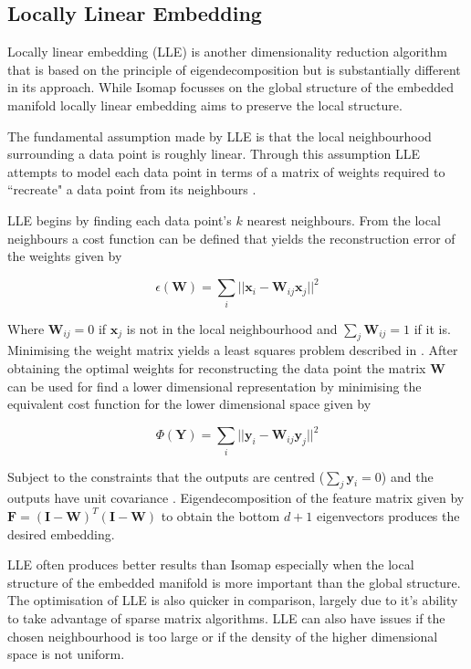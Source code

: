 \subsection{Locally Linear Embedding}
Locally linear embedding (LLE) \cite{roweis2000nonlinear} is another dimensionality reduction algorithm that is based on the principle of eigendecomposition but is substantially different in its approach. While Isomap focusses on the global structure of the embedded manifold locally linear embedding aims to preserve the local structure.

The fundamental assumption made by LLE is that the local neighbourhood surrounding a data point is roughly linear. Through this assumption LLE attempts to model each data point in terms of a matrix of weights required to ``recreate" a data point from its neighbours \cite{strange2014open}. 

LLE begins by finding each data point's $k$ nearest neighbours. From the local neighbours a cost function can be defined that yields the reconstruction error of the weights given by

\begin{equation}
	\epsilon(\bm{W}) = \sum\limits_i || \bm{x}_i - \bm{W}_{ij}\bm{x}_j ||^2 
\end{equation}

Where $\bm{W}_{ij} = 0$ if $\bm{x}_j$ is not in the local neighbourhood and $\sum\limits_j \bm{W}_{ij} = 1$ if it is. Minimising the weight matrix yields a least squares problem described in \cite{roweis2000nonlinear}. After obtaining the optimal weights for reconstructing the data point the matrix $\bm{W}$ can be used for find a lower dimensional representation by minimising the equivalent cost function for the lower dimensional space given by

 \begin{equation}
 	\Phi(\bm{Y}) = \sum\limits_i || \bm{y}_i - \bm{W}_{ij}\bm{y}_j ||^2 
 \end{equation}
 
 Subject to the constraints that the outputs are centred ($\sum\limits_j \bm{y}_i = 0$) and the outputs have unit covariance \cite{strange2014open}. Eigendecomposition of the feature matrix given by $\bm{F} = (\bm{I} - \bm{W})^T(\bm{I} - \bm{W})$  to obtain the bottom $d+1$ eigenvectors produces the desired embedding.
 
 LLE often produces better results than Isomap especially when the local structure of the embedded manifold is more important than the global structure. The optimisation of LLE is also quicker in comparison, largely due to it's ability to take advantage of sparse matrix algorithms. LLE can also have issues if the chosen neighbourhood is too large or if the density of the higher dimensional space is not uniform.

